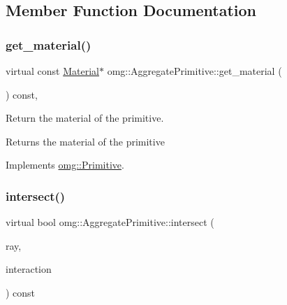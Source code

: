 \subsection{Member Function Documentation}
\mbox{\label{classomg_1_1_aggregate_primitive_a339e9fe3ab8e2c0c68c888345b834c21}} 
\subsubsection{\texorpdfstring{get\_material()}{get\_material()}}
{\footnotesize\ttfamily virtual const \mbox{\hyperlink{classomg_1_1_material}{Material}}$\ast$ omg\+::\+Aggregate\+Primitive\+::get\+\_\+material (\begin{DoxyParamCaption}{ }\end{DoxyParamCaption}) const\hspace{0.3cm}{\ttfamily [inline]}, {\ttfamily [virtual]}}



Return the material of the primitive. 

\begin{DoxyReturn}{Returns}
the material of the primitive 
\end{DoxyReturn}


Implements \mbox{\hyperlink{classomg_1_1_primitive_ad9cb98c6f74581d53cadf800fc506333}{omg\+::\+Primitive}}.

\mbox{\label{classomg_1_1_aggregate_primitive_a07ab041d9071295e4f648475c7163470}} 
\subsubsection{\texorpdfstring{intersect()}{intersect()}\hspace{0.1cm}{\footnotesize\ttfamily [1/2]}}
{\footnotesize\ttfamily virtual bool omg\+::\+Aggregate\+Primitive\+::intersect (\begin{DoxyParamCaption}\item[{const \mbox{\hyperlink{classomg_1_1_ray}{Ray}} \&}]{ray,  }\item[{\mbox{\hyperlink{classomg_1_1_surface_interaction}{Surface\+Interaction}} $\ast$}]{interaction }\end{DoxyParamCaption}) const\hspace{0.3cm}{\ttfamily [pure virtual]}}



